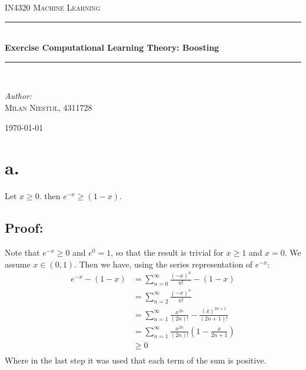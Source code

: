 \documentclass [a4paper] {report}
\begin{document}
	
	\begin{titlepage}
		\begin{center}
			
			\textsc{\LARGE IN4320 Machine Learning}\\[1.25cm]
			
			\rule{\linewidth}{0.5mm}\\[1.0cm]
			{\huge \bfseries Exercise Computational Learning Theory: Boosting }\\[0.6cm]
			\rule{\linewidth}{0.5mm}\\[1.5cm]
			
			\begin{minipage}{0.4\textwidth}
				\begin{flushleft} \large	
					\emph{Author:}\\
					\textsc{Milan Niestijl, 4311728}
				\end{flushleft}
			\end{minipage}
			
			\vfill
			{\large \today}
		\end{center}
	\end{titlepage}
	
	\section*{a.}
	Let $x\geq0$. then $e^{-x} \geq (1-x)$.\\
	\subsection*{Proof:}
	Note that $e^{-x} \geq 0$ and $e^{0} = 1$, so that the result is trivial for $x\geq 1$ and $x=0$. We assume $x \in (0,1)$. Then we have, using the series representation of $e^{-x}$:
	\begin{equation*}
		\begin{split}
			e^{-x} - (1-x) &=\sum_{n=0}^{\infty}\frac{(-x)^{n}}{n!} - (1-x)\\
			&= \sum_{n=2}^{\infty}\frac{(-x)^{n}}{n!}\\
			&= \sum_{n=1}^{\infty}\frac{x^{2n}}{(2n)!} - \frac{(x)^{2n+1}}{(2n+1)!}\\
			&= \sum_{n=1}^{\infty}\frac{x^{2n}}{(2n)!}\left( 1 - \frac{x}{2n + 1} \right)\\
			&\geq 0\\
		\end{split}
	\end{equation*}
	Where in the last step it was used that each term of the sum is positive.
\end{document}
